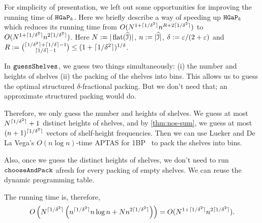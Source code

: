 For simplicity of presentation, we left out some opportunities for improving the running
time of $\operatorname{\mathtt{HGaP}}_{k}$. Here we briefly describe a way of speeding up $\operatorname{\mathtt{HGaP}}_{k}$
which reduces its running time from $O(N^{1+\lceil 1/\delta^2 \rceil}n^{R+2\lceil 1/\delta^2 \rceil})$ to
$O(N^{1+\lceil 1/\delta^2 \rceil}n^{2\lceil 1/\delta^2 \rceil})$.
Here $N := |\operatorname{flat}(\widehat{\mathcal{I}})|$, $n := |\widehat{\mathcal{I}}|$, $\delta := \varepsilon/(2+\varepsilon)$
and $R := \binom{\lceil 1/\delta^2 \rceil + \left\lceil 1/\delta \right\rceil-1}{\left\lceil 1/\delta \right\rceil-1}
\le (1+\lceil 1/\delta^2 \rceil)^{1/\delta}$.

In $\operatorname{\mathtt{guessShelves}}$, we guess two things simultaneously:
(i) the number and heights of shelves
(ii) the packing of the shelves into bins.
This allows us to guess the optimal structured $\delta$-fractional packing.
But we don't need that; an approximate structured packing would do.

Therefore, we only guess the number and heights of shelves.
We guess at most $N^{\lceil 1/\delta^2 \rceil}+1$ distinct heights of shelves,
and by \cref{thm:nos-sum}, we guess at most $(n+1)^{\lceil 1/\delta^2 \rceil}$ vectors
of shelf-height frequencies.
Then we can use Lueker and De La Vega's $O(n\log n)$-time APTAS for
1BP~\cite{bp-aptas} to pack the shelves into bins.

Also, once we guess the distinct heights of shelves,
we don't need to run $\operatorname{\mathtt{chooseAndPack}}$ afresh for every packing of empty shelves.
We can reuse the dynamic programming table.

The running time is, therefore,
\[ O\left(N^{\lceil 1/\delta^2 \rceil}\left(n^{\lceil 1/\delta^2 \rceil} n\log n + Nn^{2\lceil 1/\delta^2 \rceil}\right)\right)
= O(N^{1+\lceil 1/\delta^2 \rceil}n^{2\lceil 1/\delta^2 \rceil}). \]
